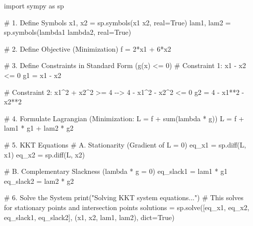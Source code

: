 \documentclass[
  letterpaper,
  DIV=11,
  numbers=noendperiod]{scrreprt}
\newenvironment{Shaded}{\begin{snugshade}}{\end{snugshade}}
\newcommand{\BuiltInTok}[1]{\textcolor[rgb]{0.00,0.23,0.31}{#1}}
\newcommand{\CommentTok}[1]{\textcolor[rgb]{0.37,0.37,0.37}{#1}}
\newcommand{\DecValTok}[1]{\textcolor[rgb]{0.68,0.00,0.00}{#1}}
\newcommand{\ImportTok}[1]{\textcolor[rgb]{0.00,0.46,0.62}{#1}}
\newcommand{\NormalTok}[1]{\textcolor[rgb]{0.00,0.23,0.31}{#1}}
\newcommand{\OperatorTok}[1]{\textcolor[rgb]{0.37,0.37,0.37}{#1}}
\newcommand{\StringTok}[1]{\textcolor[rgb]{0.13,0.47,0.30}{#1}}
\newcommand{\VariableTok}[1]{\textcolor[rgb]{0.07,0.07,0.07}{#1}}
\begin{document}
\begin{Shaded}
\begin{Highlighting}[]
\ImportTok{import}\NormalTok{ sympy }\ImportTok{as}\NormalTok{ sp}

\CommentTok{\# 1. Define Symbols}
\NormalTok{x1, x2 }\OperatorTok{=}\NormalTok{ sp.symbols(}\StringTok{\textquotesingle{}x1 x2\textquotesingle{}}\NormalTok{, real}\OperatorTok{=}\VariableTok{True}\NormalTok{)}
\NormalTok{lam1, lam2 }\OperatorTok{=}\NormalTok{ sp.symbols(}\StringTok{\textquotesingle{}lambda1 lambda2\textquotesingle{}}\NormalTok{, real}\OperatorTok{=}\VariableTok{True}\NormalTok{)}

\CommentTok{\# 2. Define Objective (Minimization)}
\NormalTok{f }\OperatorTok{=} \DecValTok{2}\OperatorTok{*}\NormalTok{x1 }\OperatorTok{+} \DecValTok{6}\OperatorTok{*}\NormalTok{x2}

\CommentTok{\# 3. Define Constraints in Standard Form (g(x) \textless{}= 0)}
\CommentTok{\# Constraint 1: x1 {-} x2 \textless{}= 0}
\NormalTok{g1 }\OperatorTok{=}\NormalTok{ x1 }\OperatorTok{{-}}\NormalTok{ x2}

\CommentTok{\# Constraint 2: x1\^{}2 + x2\^{}2 \textgreater{}= 4  {-}{-}\textgreater{} 4 {-} x1\^{}2 {-} x2\^{}2 \textless{}= 0}
\NormalTok{g2 }\OperatorTok{=} \DecValTok{4} \OperatorTok{{-}}\NormalTok{ x1}\OperatorTok{**}\DecValTok{2} \OperatorTok{{-}}\NormalTok{ x2}\OperatorTok{**}\DecValTok{2}

\CommentTok{\# 4. Formulate Lagrangian (Minimization: L = f + sum(lambda * g))}
\NormalTok{L }\OperatorTok{=}\NormalTok{ f }\OperatorTok{+}\NormalTok{ lam1 }\OperatorTok{*}\NormalTok{ g1 }\OperatorTok{+}\NormalTok{ lam2 }\OperatorTok{*}\NormalTok{ g2}

\CommentTok{\# 5. KKT Equations}
\CommentTok{\# A. Stationarity (Gradient of L = 0)}
\NormalTok{eq\_x1 }\OperatorTok{=}\NormalTok{ sp.diff(L, x1)}
\NormalTok{eq\_x2 }\OperatorTok{=}\NormalTok{ sp.diff(L, x2)}

\CommentTok{\# B. Complementary Slackness (lambda * g = 0)}
\NormalTok{eq\_slack1 }\OperatorTok{=}\NormalTok{ lam1 }\OperatorTok{*}\NormalTok{ g1}
\NormalTok{eq\_slack2 }\OperatorTok{=}\NormalTok{ lam2 }\OperatorTok{*}\NormalTok{ g2}

\CommentTok{\# 6. Solve the System}
\BuiltInTok{print}\NormalTok{(}\StringTok{"Solving KKT system equations..."}\NormalTok{)}
\CommentTok{\# This solves for stationary points and intersection points}
\NormalTok{solutions }\OperatorTok{=}\NormalTok{ sp.solve([eq\_x1, eq\_x2, eq\_slack1, eq\_slack2], (x1, x2, lam1, lam2), }\BuiltInTok{dict}\OperatorTok{=}\VariableTok{True}\NormalTok{)}


\end{Highlighting}
\end{Shaded}
\end{document}
